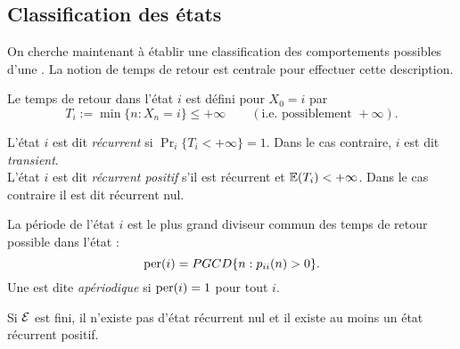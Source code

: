 \subsection{Classification des états}  


On cherche maintenant à établir une classification des comportements possibles d'une \cM. La notion de temps de retour est centrale pour effectuer cette description.

\begin{definition}
  Le temps de retour dans l'état $i$ est défini pour $X_0 = i$ par
  $$
  T_i := \min\{n : X_n = i\} \leq + \infty \qquad (\text{i.e. possiblement } + \infty).
  $$
\end{definition}

\begin{definition}
  L'état $i$ est dit {\em récurrent} si $\Pr_i\{T_i < + \infty\} = 1$. Dans le cas contraire, $i$ est dit {\em transient}. \\
  L'état $i$ est dit {\em récurrent positif} s'il est récurrent et $\operatorname{\mathbb{E}}(T_i) < + \infty$. Dans le cas contraire il est dit récurrent nul.
\end{definition}


\begin{definition}
  La période de l'état $i$ est le plus grand diviseur commun des temps de retour possible dans l'état :
  $$
  \text{per}(i) = PGCD\{n: p_{ii}(n) > 0\}.
  $$
  Une \cM est dite {\em apériodique} si $\text{per}(i) = 1$ pour tout $i$.
\end{definition}


\begin{proposition}
  Si $\mathcal{E}$ est fini, il n'existe pas d'état récurrent nul et il existe au moins un état récurrent positif.
\end{proposition}

